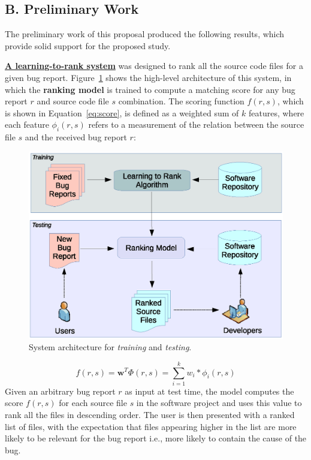 \subsection{B. Preliminary Work}
The preliminary work of this proposal produced the following results, which provide solid support for the proposed study.

\textbf{\underline{A learning-to-rank system}} \cite{Ye:FSE14,Ye:TSE15} was designed to rank all the source code files for a given bug report. Figure~\ref{fig:architecture} shows the high-level architecture of this system, in which the \textbf{ranking model} is trained to compute a matching score for any bug report $r$ and source code file $s$ combination. The scoring function $f(r, s)$, which is shown in Equation~\ref{eq:score}, is defined as a weighted sum of $k$ features, where each feature $\phi_i(r,s)$ refers to a measurement of the relation between the source file $s$ and the received bug report $r$:
\begin{figure}[t]
\centering
\includegraphics[width=\columnwidth]{figures/ye1.eps}
\caption{System architecture for {\it training} and {\it testing}.}
\label{fig:architecture}
\end{figure}
\vspace{-0.2em}
\begin{equation}
  f(r, s)= {\mathbf w}^T \Phi(r,s) = \sum_{i=1}^{k}w_i*\phi_i(r, s)
\label{eq:score}
\end{equation}
Given an arbitrary bug report $r$ as input at test time, the model computes the score $f(r, s)$ for each source file $s$ in the software project and uses this value to rank all the files in descending order. The user is then presented with a ranked list of files, with the expectation that files appearing higher in the list are more likely to be relevant for the bug report i.e., more likely to contain the cause of the bug.

